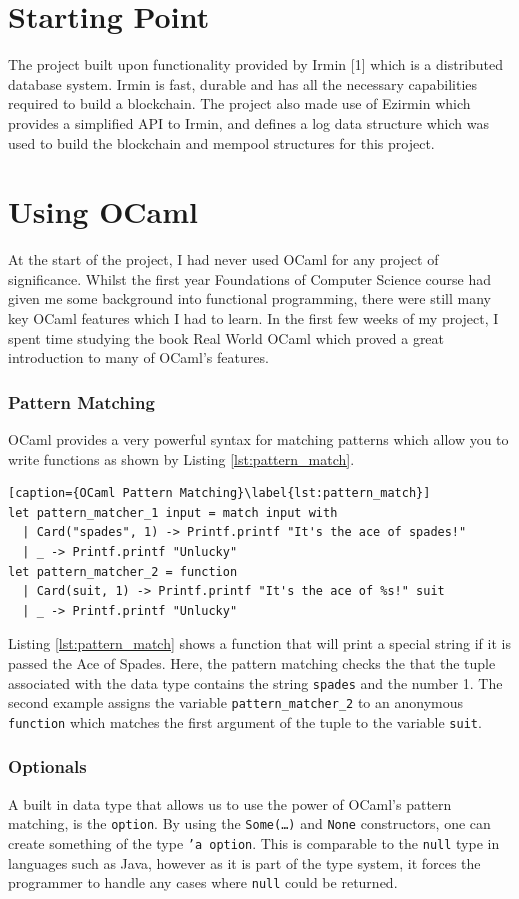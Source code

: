 \documentclass[12pt,a4paper,twoside,openright]{report}
\begin{document}
	\section{Starting Point}
		The project built upon functionality provided by Irmin [1] which is a distributed database system.  Irmin is fast, durable and has all the necessary capabilities required to build a blockchain.
		The project also made use of Ezirmin \cite{Ezirmin} which provides a simplified API to Irmin, and defines a log data structure which was used to build the blockchain and mempool structures for this project.

	\section{Using OCaml}
		At the start of the project, I had never used OCaml for any project of significance. 
		Whilst the first year Foundations of Computer Science course had given me some background into functional programming, there were still many key OCaml features which I had to learn.
		In the first few weeks of my project, I spent time studying the book Real World OCaml \cite{RealWorldOCaml} which proved a great introduction to many of OCaml's features.  

		\subsubsection*{Pattern Matching}
		OCaml provides a very powerful syntax for matching patterns which allow you to write functions as shown by Listing \ref{lst:pattern_match}.
		\begin{lstlisting}[caption={OCaml Pattern Matching}\label{lst:pattern_match}]
let pattern_matcher_1 input = match input with
  | Card("spades", 1) -> Printf.printf "It's the ace of spades!"
  | _ -> Printf.printf "Unlucky"
let pattern_matcher_2 = function
  | Card(suit, 1) -> Printf.printf "It's the ace of %s!" suit
  | _ -> Printf.printf "Unlucky"
		\end{lstlisting}
		Listing \ref{lst:pattern_match} shows a function that will print a special string if it is passed the Ace of Spades. 
		Here, the pattern matching checks the that the tuple associated with the data type contains the string \texttt{spades} and the number 1.
		The second example assigns the variable \texttt{pattern\_matcher\_2} to an anonymous \texttt{function} which matches the first argument of the tuple to the variable \texttt{suit}.
		\subsubsection*{Optionals}
		A built in data type that allows us to use the power of OCaml's pattern matching, is the \texttt{option}. 
		By using the \texttt{Some(\ldots)} and \texttt{None} constructors, one can create something of the type \texttt{'a option}. 
		This is comparable to the \texttt{null} type in languages such as Java, however as it is part of the type system, it forces the programmer to handle any cases where \texttt{null} could be returned.
\end{document}
